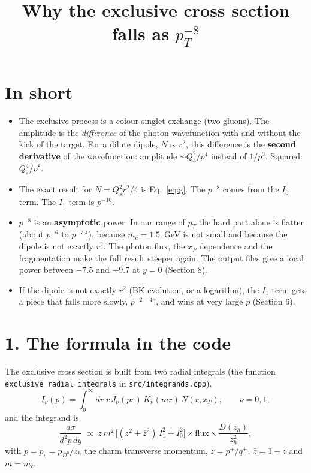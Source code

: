 \documentclass[12pt]{article}
\title{Why the exclusive cross section falls as $p_T^{-8}$}
\author{}
\date{}
\begin{document}
\maketitle

\section*{In short}

\begin{itemize}
\item The exclusive process is a colour-singlet exchange (two gluons). The amplitude is the
\emph{difference} of the photon wavefunction with and without the kick of the target. For a dilute
dipole, $N\propto r^2$, this difference is the \textbf{second derivative} of the wavefunction:
amplitude $\sim Q_s^2/p^4$ instead of $1/p^2$. Squared: $Q_s^4/p^8$.
\item The exact result for $N=Q_s^2r^2/4$ is Eq.~\eqref{eq:g}. The $p^{-8}$ comes from the $I_0$ term.
The $I_1$ term is $p^{-10}$.
\item $p^{-8}$ is an \textbf{asymptotic} power. In our range of $p_T$ the hard part alone is flatter
(about $p^{-6}$ to $p^{-7.4}$), because $m_c=1.5$~GeV is not small and because the dipole is not
exactly $r^2$. The photon flux, the $x_P$ dependence and the fragmentation make the full result
steeper again. The output files give a local power between $-7.5$ and $-9.7$ at $y=0$ (Section 8).
\item If the dipole is not exactly $r^2$ (BK evolution, or a logarithm), the $I_1$ term gets a
piece that falls more slowly, $p^{-2-4\gamma}$, and wins at very large $p$ (Section 6).
\end{itemize}

\section*{1. The formula in the code}

The exclusive cross section is built from two radial integrals (the function
\texttt{exclusive\_radial\_integrals} in \texttt{src/integrands.cpp}),
\begin{equation}
  I_\nu(p) = \int_0^\infty dr\; r\, J_\nu(p r)\, K_\nu(m r)\, N(r,x_P), \qquad \nu = 0,1,
\end{equation}
and the integrand is
\begin{equation}
  \frac{d\sigma}{d^2p\,dy} \;\propto\; z\, m^2\,\Big[(z^2+\bar z^2)\, I_1^2 + I_0^2\Big]
  \times \text{flux} \times \frac{D(z_h)}{z_h^2},
  \label{eq:code}
\end{equation}
with $p=p_c=p_{D^0}/z_h$ the charm transverse momentum, $z=p^+/q^+$, $\bar z=1-z$ and $m=m_c$.
\end{document}
